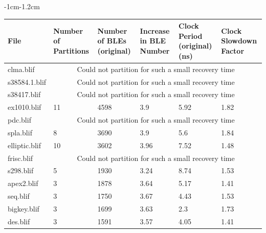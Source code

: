 \documentclass[12pt,final,oneside]{dwThesis} %
\begin{document}
\begin{table}
\begin{adjustwidth}
\begin{tabularx}
            \bottomrule 
         \end{tabularx}
         \caption{Results for target recovery time
            $7.5\times10^{-5}$s} \label{Results7.5e-5} 
      \end{adjustwidth}

   \end{table}



   \begin{table}
      \footnotesize 
      \begin{adjustwidth}
         {-1cm}{-1.2cm}

         \begin{tabularx}
            {1.1\textwidth}{XXXXXX} \toprule File & Number
            of Partitions &  Number of BLEs (original) &  Increase in BLE
            Number &  Clock Period (original) (ns) &  Clock Slowdown
            Factor\\
            \midrule

            clma.blif      & \multicolumn{5}{c}{Could not partition for such a small
               recovery time}\\
            s38584.1.blif  &  \multicolumn{5}{c}{Could not partition
               for such a small recovery time}\\
            s38417.blif    &
            \multicolumn{5}{c}{Could not partition for such a small recovery time}\\

            ex1010.blif    & 11 & 4598 & 3.9 & 5.92 & 1.82\\
            pdc.blif       &
            \multicolumn{5}{c}{Could not partition for such a small recovery time}\\

            spla.blif      & 8 & 3690 & 3.9 & 5.6 & 1.84\\
            elliptic.blif  & 10 & 3602 &
            3.96 & 7.52 & 1.48\\
            frisc.blif     &   \multicolumn{5}{c}{Could not
               partition for such a small recovery time}\\
            s298.blif      & 5 & 1930 &
            3.24 & 8.74 & 1.53\\
            apex2.blif     & 3 & 1878 & 3.64 & 5.17 & 1.41\\

            seq.blif       & 3 & 1750 & 3.67 & 4.43 & 1.53\\
            bigkey.blif    & 3 & 1699 &
            3.63 & 2.3 & 1.73\\
            des.blif       & 3 & 1591 & 3.57 & 4.05 & 1.41\\


\end{tabularx}
\end{adjustwidth}
\end{table}
\end{document}

